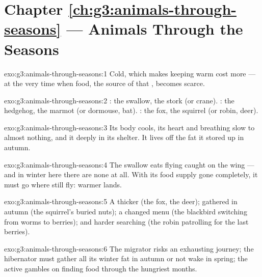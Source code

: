 \section*{Chapter \ref{ch:g3:animals-through-seasons} --- Animals Through the Seasons}

\begin{solution}{exo:g3:animals-through-seasons:1}
Cold, which makes keeping warm cost more  --- at the very
time when food, the source of that , becomes scarce.
\end{solution}

\begin{solution}{exo:g3:animals-through-seasons:2}
: the swallow, the stork (or crane). : the
hedgehog, the marmot (or dormouse, bat). : the fox,
the squirrel (or robin, deer).
\end{solution}

\begin{solution}{exo:g3:animals-through-seasons:3}
Its body cools, its heart and breathing slow to almost nothing,
and it  deeply in its shelter. It lives off the fat it
stored up in autumn.
\end{solution}

\begin{solution}{exo:g3:animals-through-seasons:4}
The swallow eats flying  caught on the wing --- and in
winter here there are none at all. With its food supply gone
completely, it must go where  still fly: warmer lands.
\end{solution}

\begin{solution}{exo:g3:animals-through-seasons:5}
A thicker  (the fox, the deer);  gathered
in autumn (the squirrel's buried nuts); a changed menu (the
blackbird switching from worms to berries); and harder
searching (the robin patrolling for the last berries).
\end{solution}

\begin{solution}{exo:g3:animals-through-seasons:6}
The migrator risks an exhausting journey; the hibernator must
gather all its winter fat in autumn or not wake in spring; the
active  gambles on finding food through the hungriest
months.
\end{solution}

